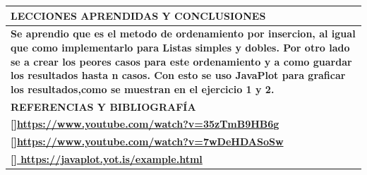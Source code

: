 \documentclass[9pt]{article}
\begin{document}
\begin{longtable}{|p{15cm}|}
		\hline
	\end{longtable}
	\begin{table}[H]
		\begin{tabular}{|p{15cm}|}
			\hline 
			\rowcolor{tablebackground}
			\color{white}\textbf{LECCIONES APRENDIDAS Y CONCLUSIONES}  \\
			\hline 
			\textbf{Se aprendio que es el metodo de ordenamiento por insercion, 
				al igual que como implementarlo para Listas simples y dobles. Por otro lado se
				a crear los peores casos para este ordenamiento y a como guardar los resultados hasta n casos. Con esto se uso JavaPlot para graficar los resultados,como se muestran en el ejercicio 1 y 2.}  \\
		\hline 
		\rowcolor{tablebackground}
		\color{white}\textbf{REFERENCIAS Y BIBLIOGRAFÍA}  \\
		\hline 
		\textbf{[]\url{https://www.youtube.com/watch?v=35zTmB9HB6g}}\\
		\textbf{[]\url{https://www.youtube.com/watch?v=7wDeHDASoSw}}\\
		\textbf{[]\url{	https://javaplot.yot.is/example.html}}\\
	
		\hline 
	\end{tabular}
\end{table}
\end{document}
